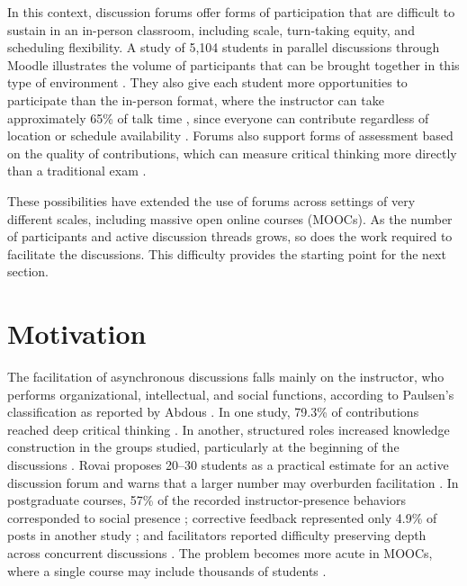 In this context, discussion forums offer forms of participation that are difficult to sustain in an in-person classroom, including scale, turn-taking equity, and scheduling flexibility. A study of 5,104 students in parallel discussions through Moodle illustrates the volume of participants that can be brought together in this type of environment \parencite{ZulfikarEtAl2019}. They also give each student more opportunities to participate than the in-person format, where the instructor can take approximately 65\% of talk time \parencite{SullivanPratt1996}, since everyone can contribute regardless of location or schedule availability \parencite{MasseyEtAl2019}. Forums also support forms of assessment based on the quality of contributions, which can measure critical thinking more directly than a traditional exam \parencite{HoSwan2007,Rovai2007}.

These possibilities have extended the use of forums across settings of very different scales, including massive open online courses (MOOCs). As the number of participants and active discussion threads grows, so does the work required to facilitate the discussions. This difficulty provides the starting point for the next section.

\section{Motivation}

The facilitation of asynchronous discussions falls mainly on the instructor, who performs organizational, intellectual, and social functions, according to Paulsen's classification as reported by Abdous \parencite{Abdous2011}. In one study, 79.3\% of contributions reached deep critical thinking \parencite{LimEtAl2011}. In another, structured roles increased knowledge construction in the groups studied, particularly at the beginning of the discussions \parencite{DeWeverEtAl2010}. Rovai proposes 20--30 students as a practical estimate for an active discussion forum and warns that a larger number may overburden facilitation \parencite{Rovai2007}. In postgraduate courses, 57\% of the recorded instructor-presence behaviors corresponded to social presence \parencite{RichardsonEtAl2015}; corrective feedback represented only 4.9\% of posts in another study \parencite{BlignautTrollip2003}; and facilitators reported difficulty preserving depth across concurrent discussions \parencite{Mansour2024}. The problem becomes more acute in MOOCs, where a single course may include thousands of students \parencite{GuEtAl2021,YuEtAl2024maic}.

